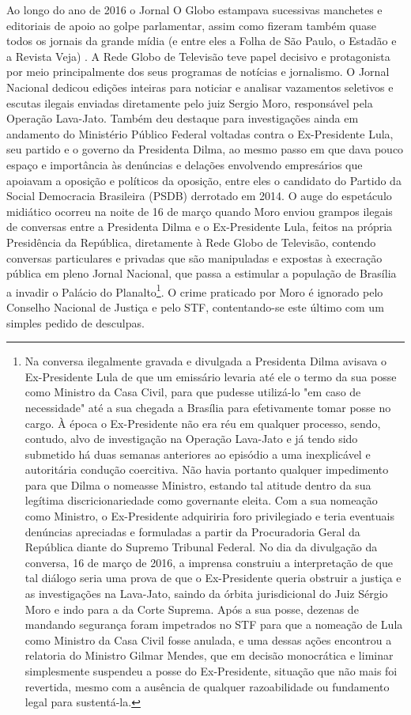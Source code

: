 Ao longo do ano de 2016 o Jornal O Globo estampava sucessivas manchetes
e editoriais de apoio ao golpe parlamentar, assim como fizeram também
quase todos os jornais da grande mídia (e entre eles a Folha de São
Paulo, o Estadão e a Revista Veja) . A Rede Globo de Televisão teve
papel decisivo e protagonista por meio principalmente dos seus programas
de notícias e jornalismo. O Jornal Nacional dedicou edições inteiras
para noticiar e analisar vazamentos seletivos e escutas ilegais enviadas
diretamente pelo juiz Sergio Moro, responsável pela Operação Lava-Jato.
Também deu destaque para investigações ainda em andamento do Ministério
Público Federal voltadas contra o Ex-Presidente Lula, seu partido e o
governo da Presidenta Dilma, ao mesmo passo em que dava pouco espaço e
importância às denúncias e delações envolvendo empresários que apoiavam
a oposição e políticos da oposição, entre eles o candidato do Partido da
Social Democracia Brasileira (PSDB) derrotado em 2014. O auge do
espetáculo midiático ocorreu na noite de 16 de março quando Moro enviou
grampos ilegais de conversas entre a Presidenta Dilma e o Ex-Presidente
Lula, feitos na própria Presidência da República, diretamente à Rede
Globo de Televisão, contendo conversas particulares e privadas que são
manipuladas e expostas à execração pública em pleno Jornal Nacional, que
passa a estimular a população de Brasília a invadir o Palácio do
Planalto\footnote{Na conversa ilegalmente gravada e divulgada a
  Presidenta Dilma avisava o Ex-Presidente Lula de que um emissário
  levaria até ele o termo da sua posse como Ministro da Casa Civil, para
  que pudesse utilizá-lo "em caso de necessidade" até a sua chegada a
  Brasília para efetivamente tomar posse no cargo. À época o
  Ex-Presidente não era réu em qualquer processo, sendo, contudo, alvo
  de investigação na Operação Lava-Jato e já tendo sido submetido há
  duas semanas anteriores ao episódio a uma inexplicável e autoritária
  condução coercitiva. Não havia portanto qualquer impedimento para que
  Dilma o nomeasse Ministro, estando tal atitude dentro da sua legítima
  discricionariedade como governante eleita. Com a sua nomeação como
  Ministro, o Ex-Presidente adquiriria foro privilegiado e teria
  eventuais denúncias apreciadas e formuladas a partir da Procuradoria
  Geral da República diante do Supremo Tribunal Federal. No dia da
  divulgação da conversa, 16 de março de 2016, a imprensa construiu a
  interpretação de que tal diálogo seria uma prova de que o
  Ex-Presidente queria obstruir a justiça e as investigações na
  Lava-Jato, saindo da órbita jurisdicional do Juiz Sérgio Moro e indo
  para a da Corte Suprema. Após a sua posse, dezenas de mandando
  segurança foram impetrados no STF para que a nomeação de Lula como
  Ministro da Casa Civil fosse anulada, e uma dessas ações encontrou a
  relatoria do Ministro Gilmar Mendes, que em decisão monocrática e
  liminar simplesmente suspendeu a posse do Ex-Presidente, situação que
  não mais foi revertida, mesmo com a ausência de qualquer razoabilidade
  ou fundamento legal para sustentá-la.}. O crime praticado por Moro é
ignorado pelo Conselho Nacional de Justiça e pelo STF, contentando-se
este último com um simples pedido de desculpas.

